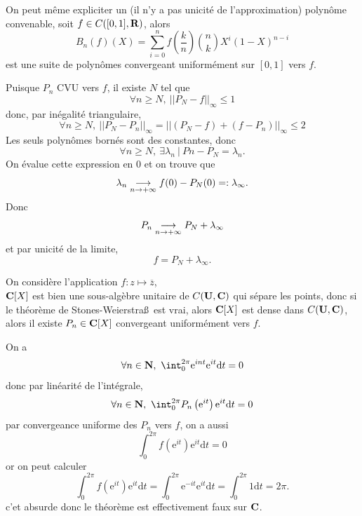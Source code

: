 \documentclass[a4paper,11pt, twoside]{article}
\begin{document}
On peut même expliciter un (il n'y a pas unicité de l'approximation) polynôme convenable, soit $f\in C([0,1],\mathbf R)$, alors 
$$B_n(f)(X)=\sum_{i=0}^nf\left(\frac{k}{n}\right)\binom{n}{k}X^i(1-X)^{n-i}$$
est une suite de polynômes convergeant uniformément sur $[0,1]$ vers $f$.\\[1em]




\begin{Proof}
  Puisque $P_n$ CVU vers $f$, il existe $N$ tel que 
  $$\forall n\geqslant N,\ ||P_N-f||_{\infty}\leqslant 1$$
  donc, par inégalité triangulaire,
  $$\forall n\geqslant N,\ ||P_N-P_n||_{\infty}=||(P_N-f)+(f-P_n)||_{\infty}\leqslant 2$$
  Les seuls polynômes bornés sont des constantes, donc 
  $$\forall n\geqslant N,\ \exists \lambda_n\ |\ Pn-P_N=\lambda_n.$$
  On évalue cette expression en 0 et on trouve que 
  $$\lambda_n \underset{n\to+\infty}{\longrightarrow} f(0) - P_N(0)=:\lambda_{\infty}.$$
  Donc $$P_n\underset{n\to+\infty}{\longrightarrow} P_N + \lambda_{\infty}$$
  et par unicité de la limite, 
  $$f=P_N+\lambda_{\infty}.$$
\end{Proof}




\begin{Proof}
  On considère l'application $f:z\longmapsto \overline z$,\\
  $\mathbf C[X]$ est bien une sous-algèbre unitaire de $C(\mathbf U,\mathbf C)$ qui sépare les points, donc si le théorème de Stones-Weierstra\ss\ est vrai, alors $\mathbf C[X]$ est dense dans $C(\mathbf U,\mathbf C)$, alors il existe $P_n\in\mathbf C[X]$ convergeant uniformément vers $f$.

  On a 
  $$\forall n\in\N,\ \int_0^{2\pi}\mathrm e^{int}\mathrm e^{it}\mathrm dt=0$$
  donc par linéarité de l'intégrale,
  $$\forall n\in\N,\ \int_0^{2\pi}P_n\left(\mathrm e^{it}\right)\mathrm e^{it}\mathrm dt=0$$
  par convergeance uniforme des $P_n$ vers $f$, on a aussi
  $$\int_0^{2\pi}f\left(\mathrm e^{it}\right)\mathrm e^{it}\mathrm dt=0$$
  or on peut calculer
  $$\int_0^{2\pi}f\left(\mathrm e^{it}\right)\mathrm e^{it}\mathrm dt=\int_0^{2\pi}\mathrm e^{-it}\mathrm e^{it}\mathrm dt=\int_0^{2\pi}1\mathrm dt=2\pi.$$
  c'et absurde donc le théorème est effectivement faux sur $\mathbf C$.
\end{Proof}
\end{document}
